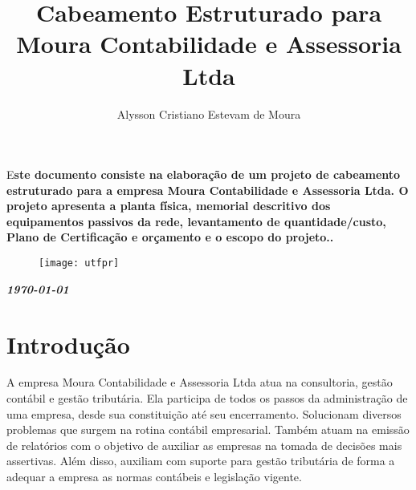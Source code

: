 \documentclass[	DIV=calc,%
							paper=a4,%
							fontsize=12pt,%
							onecolumn]{scrartcl}	 					%
\title{Cabeamento Estruturado para Moura Contabilidade e Assessoria Ltda }					%
\author{Alysson Cristiano Estevam de Moura }  	%
\date{}																				%
\newcommand{\initial}[1]{%
     \lettrine[lines=3,lhang=0.3,nindent=0em]{
     				\color{DarkGoldenrod}
     				{\textsf{#1}}}{}}
\begin{document}
\maketitle
\thispagestyle{fancy} 	
\thispagestyle{empty}		%





\initial{E}\textbf{ste documento consiste na elaboração de um projeto de cabeamento estruturado para a empresa Moura Contabilidade e Assessoria Ltda. O projeto apresenta a planta física, memorial descritivo dos equipamentos passivos da rede, levantamento de quantidade/custo, Plano de Certificação e orçamento e o escopo do projeto..}


\begin{figure}
	\centering
	\texttt{[image: utfpr]}
\end{figure}

\vspace{2cm}
\centerline{\textit{\textbf{\today}}}

\clearpage
    \renewcommand*\listfigurename{Lista de figuras}
\listoffigures

\renewcommand*\listtablename{Lista de tabelas}
\listoftables




\clearpage
\renewcommand{\contentsname}{Sumário}
\tableofcontents
\clearpage

\section{Introdução}

A empresa Moura Contabilidade e Assessoria Ltda atua na consultoria, gestão contábil e gestão tributária. Ela participa de todos os passos da administração de uma empresa, desde sua constituição até seu encerramento. Solucionam diversos problemas que surgem na rotina contábil empresarial. Também atuam na emissão de relatórios com o objetivo de auxiliar as empresas na tomada de decisões mais assertivas. Além disso, auxiliam com suporte para gestão tributária de forma a adequar a empresa as normas contábeis e legislação vigente.
\end{document}
